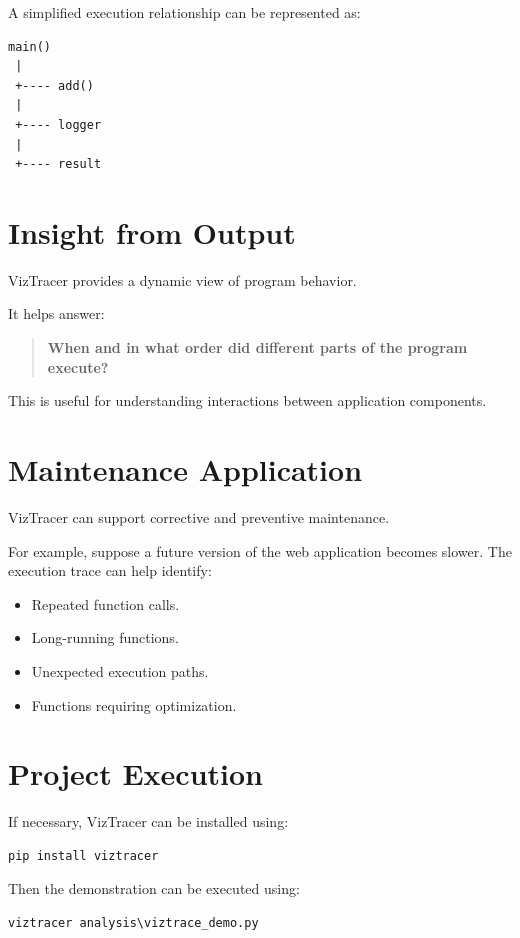 \documentclass[12pt,a4paper]{report}
\begin{document}
A simplified execution relationship can be represented as:

\begin{lstlisting}
main()
 |
 +---- add()
 |
 +---- logger
 |
 +---- result
\end{lstlisting}

\section{Insight from Output}

VizTracer provides a dynamic view of program behavior.

It helps answer:

\begin{quote}
\textbf{When and in what order did different parts of the program execute?}
\end{quote}

This is useful for understanding interactions between application
components.

\section{Maintenance Application}

VizTracer can support corrective and preventive maintenance.

For example, suppose a future version of the web application becomes
slower. The execution trace can help identify:

\begin{itemize}
    \item Repeated function calls.
    \item Long-running functions.
    \item Unexpected execution paths.
    \item Functions requiring optimization.
\end{itemize}

\section{Project Execution}

If necessary, VizTracer can be installed using:

\begin{lstlisting}
pip install viztracer
\end{lstlisting}

Then the demonstration can be executed using:

\begin{lstlisting}
viztracer analysis\viztrace_demo.py
\end{lstlisting}
\end{document}
